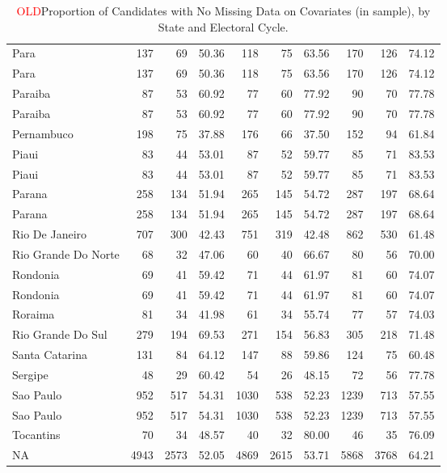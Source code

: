\documentclass[12pt,english]{article}
\newcommand{\lyxdot}{.}
\numberwithin{equation}{section}
\theoremstyle{plain}
\theoremstyle{remark}
\theoremstyle{plain}
\newcommand{\red}[1]{\textcolor{red}{#1}}
\begin{document}
\begin{table}[H]
\begin{tabular}{lrrrrrrrrr}
  Para & 137 & 69 & 50.36 & 118 & 75 & 63.56 & 170 & 126 & 74.12\\
  Para & 137 & 69 & 50.36 & 118 & 75 & 63.56 & 170 & 126 & 74.12\\
  \addlinespace
  Paraiba & 87 & 53 & 60.92 & 77 & 60 & 77.92 & 90 & 70 & 77.78\\
  Paraiba & 87 & 53 & 60.92 & 77 & 60 & 77.92 & 90 & 70 & 77.78\\
  Pernambuco & 198 & 75 & 37.88 & 176 & 66 & 37.50 & 152 & 94 & 61.84\\
  Piaui & 83 & 44 & 53.01 & 87 & 52 & 59.77 & 85 & 71 & 83.53\\
  Piaui & 83 & 44 & 53.01 & 87 & 52 & 59.77 & 85 & 71 & 83.53\\
  \addlinespace
  Parana & 258 & 134 & 51.94 & 265 & 145 & 54.72 & 287 & 197 & 68.64\\
  Parana & 258 & 134 & 51.94 & 265 & 145 & 54.72 & 287 & 197 & 68.64\\
  Rio De Janeiro & 707 & 300 & 42.43 & 751 & 319 & 42.48 & 862 & 530 & 61.48\\
  Rio Grande Do Norte & 68 & 32 & 47.06 & 60 & 40 & 66.67 & 80 & 56 & 70.00\\
  Rondonia & 69 & 41 & 59.42 & 71 & 44 & 61.97 & 81 & 60 & 74.07\\
  \addlinespace
  Rondonia & 69 & 41 & 59.42 & 71 & 44 & 61.97 & 81 & 60 & 74.07\\
  Roraima & 81 & 34 & 41.98 & 61 & 34 & 55.74 & 77 & 57 & 74.03\\
  Rio Grande Do Sul & 279 & 194 & 69.53 & 271 & 154 & 56.83 & 305 & 218 & 71.48\\
  Santa Catarina & 131 & 84 & 64.12 & 147 & 88 & 59.86 & 124 & 75 & 60.48\\
  Sergipe & 48 & 29 & 60.42 & 54 & 26 & 48.15 & 72 & 56 & 77.78\\
  \addlinespace
  Sao Paulo & 952 & 517 & 54.31 & 1030 & 538 & 52.23 & 1239 & 713 & 57.55\\
  Sao Paulo & 952 & 517 & 54.31 & 1030 & 538 & 52.23 & 1239 & 713 & 57.55\\
  Tocantins & 70 & 34 & 48.57 & 40 & 32 & 80.00 & 46 & 35 & 76.09\\
  NA & 4943 & 2573 & 52.05 & 4869 & 2615 & 53.71 & 5868 & 3768 & 64.21\\
  \bottomrule
  \end{tabular}
  \endgroup{}
  \caption{\red{OLD}Proportion of Candidates with No Missing Data on Covariates (in sample), by State and Electoral Cycle.}
\label{coverage}
  \end{table}

{\linespread{1} \small  
}
\end{document}
